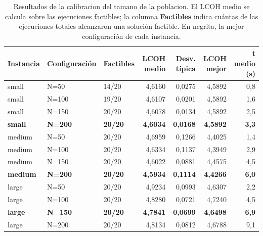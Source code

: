 \begin{table}[H]
    \centering
    \small
    \renewcommand{\arraystretch}{1.25}
    \begin{tabular}{lllrrrr}
        \hline
        \textbf{Instancia} & \textbf{Configuración} & \textbf{Factibles} & \textbf{LCOH medio} & \textbf{Desv. típica} & \textbf{LCOH mejor} & \textbf{t medio (s)} \\
        \hline
        small & N=50 & 14/20 & 4,6160 & 0,0275 & 4,5892 & 0,8 \\
        small & N=100 & 19/20 & 4,6107 & 0,0201 & 4,5892 & 1,6 \\
        small & N=150 & 20/20 & 4,6078 & 0,0134 & 4,5892 & 2,5 \\
        \textbf{small} & \textbf{N=200} & \textbf{20/20} & \textbf{4,6034} & \textbf{0,0168} & \textbf{4,5892} & \textbf{3,3} \\
        \hline
        medium & N=50 & 20/20 & 4,6959 & 0,1266 & 4,4025 & 1,4 \\
        medium & N=100 & 20/20 & 4,6334 & 0,1137 & 4,3949 & 2,9 \\
        medium & N=150 & 20/20 & 4,6022 & 0,0881 & 4,4575 & 4,5 \\
        \textbf{medium} & \textbf{N=200} & \textbf{20/20} & \textbf{4,5934} & \textbf{0,1114} & \textbf{4,4266} & \textbf{6,0} \\
        \hline
        large & N=50 & 20/20 & 4,9234 & 0,0993 & 4,6307 & 2,2 \\
        large & N=100 & 20/20 & 4,8280 & 0,0721 & 4,7240 & 4,5 \\
        \textbf{large} & \textbf{N=150} & \textbf{20/20} & \textbf{4,7841} & \textbf{0,0699} & \textbf{4,6498} & \textbf{6,9} \\
        large & N=200 & 20/20 & 4,8134 & 0,0812 & 4,6788 & 9,1 \\
        \hline
    \end{tabular}
    \caption{Resultados de la calibracion del tamano de la poblacion. El LCOH medio se calcula sobre las ejecuciones factibles; la columna \textbf{Factibles} indica cuántas de las ejecuciones totales alcanzaron una solución factible. En negrita, la mejor configuración de cada instancia.}
    \label{tab:calib_e04_n}
\end{table}

